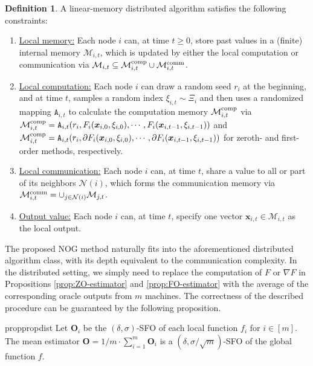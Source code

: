 \documentclass{article}
\def\vx{{\bm{x}}}
\def\mO{{\bm{O}}}
\def\gM{{\mathcal{M}}}
\def\gN{{\mathcal{N}}}
\theoremstyle{definition}
\newtheorem{dfn}{Definition}[section]
\theoremstyle{remark}
\begin{document}
	\begin{dfn}
		A linear-memory distributed algorithm satisfies the following constraints:
		\begin{enumerate}
			\item \underline{Local memory:} Each node $i$ can, at time $t \ge 0$,  store past values in a (finite) internal memory $\gM_{i,t}$, which is updated by either the local computation or communication via $\gM_{i,t} \subseteq \gM_{i,t}^{\rm comp} \cup \gM_{i,t}^{\rm comm}$.
			\item \underline{Local computation:} Each node  $i$
			can draw a random seed $r_i$ at the beginning, and at time $t$,  samples a random index $\xi_{i,t} \sim \Xi_{i}$ and 
			then uses a randomized mapping $\texttt{A}_{i,t}$ to calculate the computation memory $\gM_{i,t}^{\rm comp}$ via $\gM_{i,t}^{\rm comp} = \texttt{A}_{i,t}(r_i, F_i(\vx_{i,0},\xi_{i,0}), \cdots, F_i(\vx_{i,t-1},\xi_{i,t-1}))$ and $\gM_{i,t}^{\rm comp} = \texttt{A}_{i,t}(r_i, \partial F_i(\vx_{i,0},\xi_{i,0}), \cdots, \partial F_i(\vx_{i,t-1},\xi_{i,t-1}))$ for zeroth- and first-order methods, respectively.
			\item \underline{Local communication:} Each node $i$ can, at time $t$, share a value to all or part of its neighbors $\gN(i)$, which forms the communication memory via $\gM_{i,t}^{\rm comm} = \cup_{j \in \gN(i)} \gM_{j,t}$.
			\item \underline{Output value:} Each node $i$ can, at time $t$, specify one vector $\vx_{i,t} \in \gM_{i,t}$ as the local output.
		\end{enumerate}
	\end{dfn}
	
	The proposed NOG method naturally fits into the aforementioned distributed algorithm class, with its depth equivalent to the communication complexity. 
	In the distributed setting, we simply need to replace the computation of $F$ or $\nabla F$ in Propositions \ref{prop:ZO-estimator} and \ref{prop:FO-estimator} with the average of the corresponding oracle outputs from $m$ machines. The correctness of the described procedure can be guaranteed by the following proposition.
	
	\begin{restatable}{prop}{propdist} \label{prop:guaran-dist}
		Let $\mO_i$ be the $(\delta,\sigma)$-SFO of each local function $f_i$ for $i \in [m]$. The mean estimator $\mO = 1/m \cdot \sum_{i=1}^m \mO_i$ is a $(\delta,\sigma/\sqrt{m})$-SFO of the global function $f$.
	\end{restatable}
	
\end{document}
